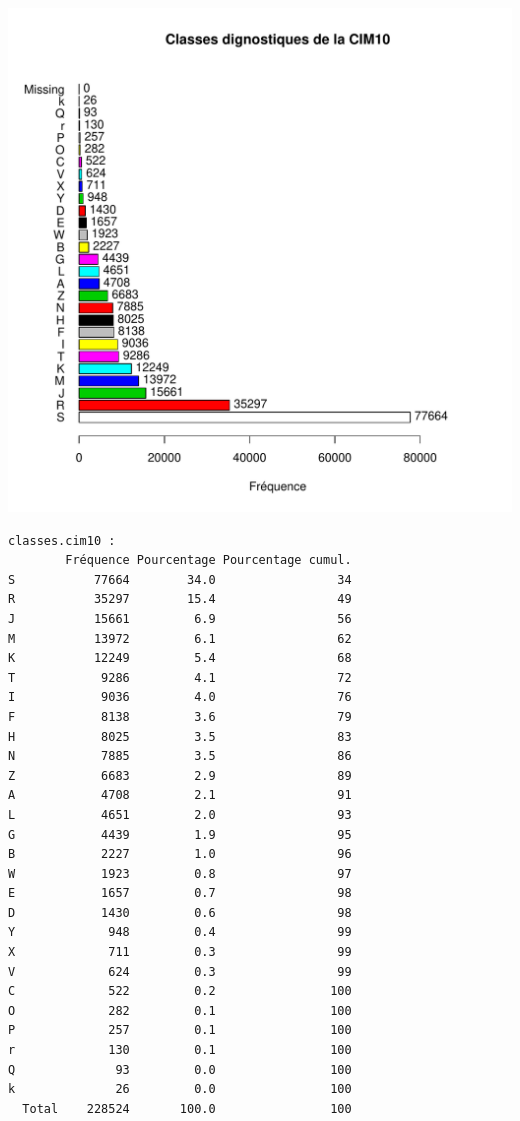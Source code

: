 \documentclass[12pt,english,french,twoside]{book}\usepackage[]{graphicx}\usepackage[]{color}
\makeatletter
\def\maxwidth{ %
  \ifdim\Gin@nat@width>\linewidth
    \linewidth
  \else
    \Gin@nat@width
  \fi
}
\newenvironment{kframe}{%
 \def\at@end@of@kframe{}%
 \ifinner\ifhmode%
  \def\at@end@of@kframe{\end{minipage}}%
  \begin{minipage}{\columnwidth}%
 \fi\fi%
 \def\FrameCommand##1{\hskip\@totalleftmargin \hskip-\fboxsep
 \colorbox{shadecolor}{##1}\hskip-\fboxsep
     \hskip-\linewidth \hskip-\@totalleftmargin \hskip\columnwidth}%
 \MakeFramed {\advance\hsize-\width
   \@totalleftmargin\z@ \linewidth\hsize
   \@setminipage}}%
 {\par\unskip\endMakeFramed%
 \at@end@of@kframe}
\newenvironment{knitrout}{}{} %
\makeatother
\begin{document}
\begin{knitrout}
\color{fgcolor}
\includegraphics[width=\maxwidth]{figure/class_cim10-1} 
\begin{kframe}\begin{verbatim}
classes.cim10 :  
        Fréquence Pourcentage Pourcentage cumul.
S           77664        34.0                 34
R           35297        15.4                 49
J           15661         6.9                 56
M           13972         6.1                 62
K           12249         5.4                 68
T            9286         4.1                 72
I            9036         4.0                 76
F            8138         3.6                 79
H            8025         3.5                 83
N            7885         3.5                 86
Z            6683         2.9                 89
A            4708         2.1                 91
L            4651         2.0                 93
G            4439         1.9                 95
B            2227         1.0                 96
W            1923         0.8                 97
E            1657         0.7                 98
D            1430         0.6                 98
Y             948         0.4                 99
X             711         0.3                 99
V             624         0.3                 99
C             522         0.2                100
O             282         0.1                100
P             257         0.1                100
r             130         0.1                100
Q              93         0.0                100
k              26         0.0                100
  Total    228524       100.0                100
\end{verbatim}
\end{kframe}
\end{knitrout}
\end{document}
